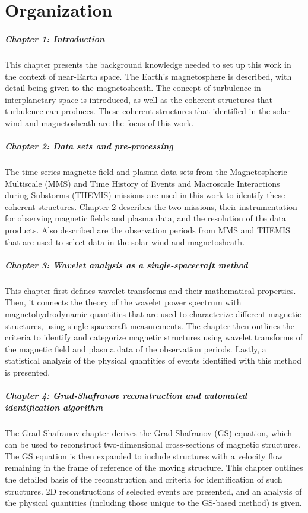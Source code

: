 \chapter*{Organization}

\paragraph*{Chapter 1: Introduction}
This chapter presents the background knowledge needed to set up this work in the context of near-Earth space. The Earth's magnetosphere is described, with detail being given to the magnetosheath. The concept of turbulence in interplanetary space is introduced, as well as the coherent structures that turbulence can produces. These coherent structures that identified in the solar wind and magnetosheath are the focus of this work.

\paragraph*{Chapter 2: Data sets and pre-processing}
The time series magnetic field and plasma data sets from the Magnetospheric Multiscale (MMS) and Time History of Events and Macroscale Interactions during Substorms (THEMIS) missions are used in this work to identify these coherent structures. Chapter 2 describes the two missions, their instrumentation for observing magnetic fields and plasma data, and the resolution of the data products. Also described are the observation periods from MMS and THEMIS that are used to select data in the solar wind and magnetosheath.

\paragraph*{Chapter 3: Wavelet analysis as a single-spacecraft method}
This chapter first defines wavelet transforms and their mathematical properties. Then, it connects the theory of the wavelet power spectrum with magnetohydrodynamic quantities that are used to characterize different magnetic structures, using single-spacecraft measurements. The chapter then outlines the criteria to identify and categorize magnetic structures using wavelet transforms of the magnetic field and plasma data of the observation periods. Lastly, a statistical analysis of the physical quantities of events identified with this method is presented.

\paragraph*{Chapter 4: Grad-Shafranov reconstruction and automated identification algorithm}
The Grad-Shafranov chapter derives the Grad-Shafranov (GS) equation, which can be used to reconstruct two-dimensional cross-sections of magnetic structures. The GS equation is then expanded to include structures with a velocity flow remaining in the frame of reference of the moving structure. This chapter outlines the detailed basis of the reconstruction and criteria for identification of such structures. 2D reconstructions of selected events are presented, and an analysis of the physical quantities (including those unique to the GS-based method) is given.

